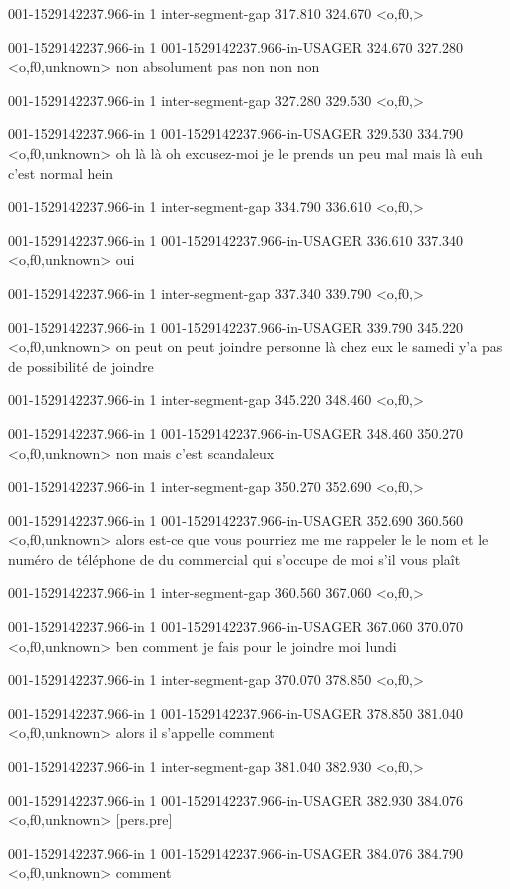 001-1529142237.966-in 1 inter-segment-gap 317.810 324.670 <o,f0,>

001-1529142237.966-in 1 001-1529142237.966-in-USAGER 324.670 327.280 <o,f0,unknown> non absolument pas non non non

001-1529142237.966-in 1 inter-segment-gap 327.280 329.530 <o,f0,>

001-1529142237.966-in 1 001-1529142237.966-in-USAGER 329.530 334.790 <o,f0,unknown> oh là là oh excusez-moi je le prends un peu mal mais là euh c'est normal hein

001-1529142237.966-in 1 inter-segment-gap 334.790 336.610 <o,f0,>

001-1529142237.966-in 1 001-1529142237.966-in-USAGER 336.610 337.340 <o,f0,unknown> oui

001-1529142237.966-in 1 inter-segment-gap 337.340 339.790 <o,f0,>

001-1529142237.966-in 1 001-1529142237.966-in-USAGER 339.790 345.220 <o,f0,unknown> on peut on peut joindre personne là chez eux le samedi y'a pas de possibilité de joindre

001-1529142237.966-in 1 inter-segment-gap 345.220 348.460 <o,f0,>

001-1529142237.966-in 1 001-1529142237.966-in-USAGER 348.460 350.270 <o,f0,unknown> non mais c'est scandaleux

001-1529142237.966-in 1 inter-segment-gap 350.270 352.690 <o,f0,>

001-1529142237.966-in 1 001-1529142237.966-in-USAGER 352.690 360.560 <o,f0,unknown> alors est-ce que vous pourriez me me rappeler le le nom et le numéro de téléphone de du commercial qui s'occupe de moi s'il vous plaît

001-1529142237.966-in 1 inter-segment-gap 360.560 367.060 <o,f0,>

001-1529142237.966-in 1 001-1529142237.966-in-USAGER 367.060 370.070 <o,f0,unknown> ben comment je fais pour le joindre moi lundi

001-1529142237.966-in 1 inter-segment-gap 370.070 378.850 <o,f0,>

001-1529142237.966-in 1 001-1529142237.966-in-USAGER 378.850 381.040 <o,f0,unknown> alors il s'appelle comment

001-1529142237.966-in 1 inter-segment-gap 381.040 382.930 <o,f0,>

001-1529142237.966-in 1 001-1529142237.966-in-USAGER 382.930 384.076 <o,f0,unknown> [pers.pre]

001-1529142237.966-in 1 001-1529142237.966-in-USAGER 384.076 384.790 <o,f0,unknown> comment

